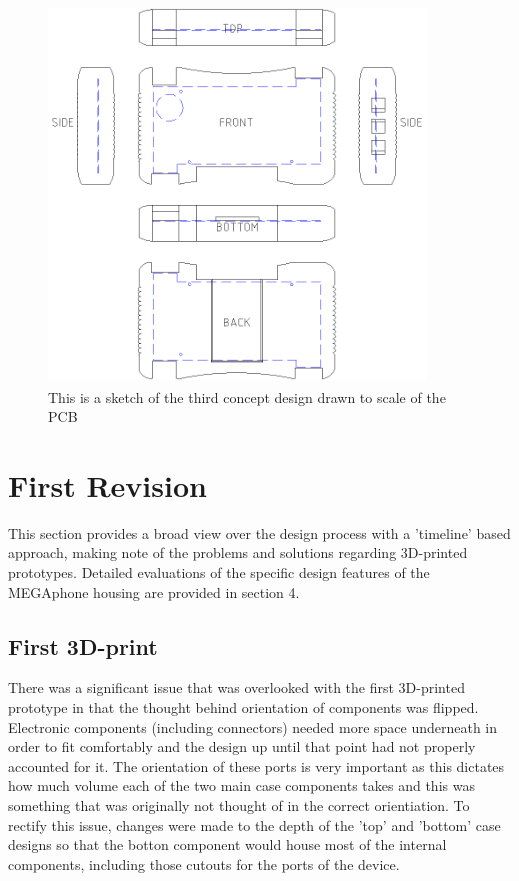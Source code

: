 \begin{figure} [h]
\centering
\includegraphics[width=10cm,height=10cm,keepaspectratio]{Figures/design3_sketch.png}
\caption{This is a sketch of the third concept design drawn to scale of the PCB}
\label{fig:Design_3}
\end{figure}

\section{First Revision}

This section provides a broad view over the design process with a 'timeline' based approach, making note of the problems and solutions regarding 3D-printed prototypes.
Detailed evaluations of the specific design features of the MEGAphone housing are provided in section 4.

\subsection{First 3D-print}

There was a significant issue that was overlooked with the first 3D-printed prototype in that the thought behind orientation of components was flipped.
Electronic components (including connectors) needed more space underneath in order to fit comfortably and the design up until that point had not properly accounted for it.
The orientation of these ports is very important as this dictates how much volume each of the two main case components takes and this was something that was originally not thought of in the correct orientiation.
To rectify this issue, changes were made to the depth of the 'top' and 'bottom' case designs so that the botton component would house most of the internal components, including those cutouts for the ports of the device.

